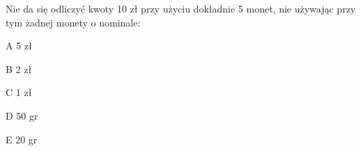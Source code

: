 \begin{tresc}
Nie da się odliczyć kwoty 10 zł przy użyciu dokładnie 5 monet, nie używając przy tym żadnej monety o nominale:
\end{tresc}
\begin{wariant}{A} 5 zł \end{wariant}
\begin{wariant}{B} 2 zł \end{wariant}
\begin{wariant}{C} 1 zł \end{wariant}
\begin{wariant}{D} 50 gr \end{wariant}
\begin{wariant}{E} 20 gr \end{wariant}
